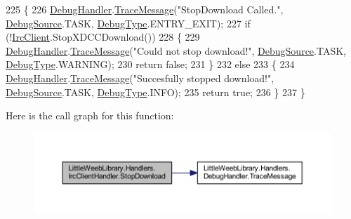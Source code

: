 \begin{DoxyCode}
225         \{
226             \mbox{\hyperlink{class_little_weeb_library_1_1_handlers_1_1_irc_client_handler_ab50ece494948d25db1839f4d6eab038f}{DebugHandler}}.\mbox{\hyperlink{interface_little_weeb_library_1_1_handlers_1_1_i_debug_handler_a2e405bc3492e683cd3702fae125221bc}{TraceMessage}}(\textcolor{stringliteral}{"StopDownload Called."}, 
      \mbox{\hyperlink{namespace_little_weeb_library_1_1_handlers_a2a6ca0775121c9c503d58aa254d292be}{DebugSource}}.TASK, \mbox{\hyperlink{namespace_little_weeb_library_1_1_handlers_ab66019ed40462876ec4e61bb3ccb0a62}{DebugType}}.ENTRY\_EXIT);
227             \textcolor{keywordflow}{if} (!\mbox{\hyperlink{class_little_weeb_library_1_1_handlers_1_1_irc_client_handler_a1c78638ea8025b27bb3e604f432ce325}{IrcClient}}.StopXDCCDownload())
228             \{
229                 \mbox{\hyperlink{class_little_weeb_library_1_1_handlers_1_1_irc_client_handler_ab50ece494948d25db1839f4d6eab038f}{DebugHandler}}.\mbox{\hyperlink{interface_little_weeb_library_1_1_handlers_1_1_i_debug_handler_a2e405bc3492e683cd3702fae125221bc}{TraceMessage}}(\textcolor{stringliteral}{"Could not stop download!"}, 
      \mbox{\hyperlink{namespace_little_weeb_library_1_1_handlers_a2a6ca0775121c9c503d58aa254d292be}{DebugSource}}.TASK, \mbox{\hyperlink{namespace_little_weeb_library_1_1_handlers_ab66019ed40462876ec4e61bb3ccb0a62}{DebugType}}.WARNING);
230                 \textcolor{keywordflow}{return} \textcolor{keyword}{false};
231             \}
232             \textcolor{keywordflow}{else}
233             \{
234                 \mbox{\hyperlink{class_little_weeb_library_1_1_handlers_1_1_irc_client_handler_ab50ece494948d25db1839f4d6eab038f}{DebugHandler}}.\mbox{\hyperlink{interface_little_weeb_library_1_1_handlers_1_1_i_debug_handler_a2e405bc3492e683cd3702fae125221bc}{TraceMessage}}(\textcolor{stringliteral}{"Succesfully stopped download!"}, 
      \mbox{\hyperlink{namespace_little_weeb_library_1_1_handlers_a2a6ca0775121c9c503d58aa254d292be}{DebugSource}}.TASK, \mbox{\hyperlink{namespace_little_weeb_library_1_1_handlers_ab66019ed40462876ec4e61bb3ccb0a62}{DebugType}}.INFO);
235                 \textcolor{keywordflow}{return} \textcolor{keyword}{true};
236             \}
237         \}
\end{DoxyCode}
Here is the call graph for this function\+:\nopagebreak
\begin{figure}[H]
\begin{center}
\leavevmode
\includegraphics[width=350pt]{class_little_weeb_library_1_1_handlers_1_1_irc_client_handler_a265ca021f5086addf758e87f59a0aa11_cgraph}
\end{center}
\end{figure}
